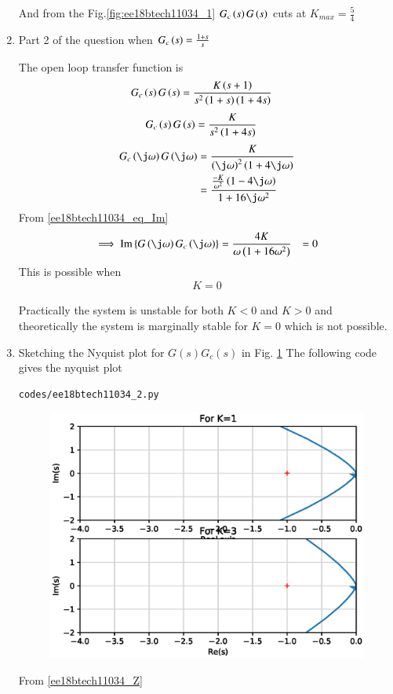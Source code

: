 \begin{enumerate}[label=\thesubsection.\arabic*.,ref=\thesubsection.\theenumi]
And from the Fig.\ref{fig:ee18btech11034_1} $G_{c}\left(s\right)G\left(s\right)$ cuts  at $K_{max} = \frac{5}{4}$

\solution
\item Part 2 of the question when $G_{c}\left(s\right) = \frac{1+s}{s}$

The open loop transfer function is 
\begin{align}
    G_{c}\left(s\right)G\left(s\right) &= \frac{K\left(s+1\right)}{s^2\left(1+s\right)\left(1+4s\right)}
\end{align}
\begin{align}
    G_{c}\left(s\right)G\left(s\right) &= \frac{K}{s^2\left(1+4s\right)}
\end{align}
\begin{align}
    G_{c}\brak{\j\omega}G\brak{\j\omega} &= \frac{K}{\brak{\j\omega}^2\brak{1+4\j\omega}}
    \\
    &= \frac{\frac{-K}{\omega^2}\brak{1-4\j\omega}}{1+16\j\omega^2}
\end{align}
From \eqref{ee18btech11034_eq_Im}
\begin{align}
    \implies \text{Im} \cbrak{G\brak{\j \omega}G_{c}\brak{\j\omega}} &= \frac{4K}{{\omega}\brak{1+16\omega^2}} &= 0
\end{align}
This is possible when 
\begin{align}
    K = 0
    \label{ee18btech11034_3}
\end{align}

Practically the system is unstable for both $K < 0$ and $K > 0$ and theoretically the system is marginally stable for $K = 0$ which is not possible.

\item Sketching the Nyquist plot for $G(s)G_c(s)$ in Fig. \ref{fig:ee18btech11034_2}
The following code gives the nyquist plot
\begin{lstlisting}
codes/ee18btech11034_2.py
\end{lstlisting}
\begin{figure}[!h]
\centering
\includegraphics[width=\columnwidth]{./figs/ee18btech11034_2.eps}
\caption{}
\label{fig:ee18btech11034_2}
\end{figure}
From \eqref{ee18btech11034_Z}


\end{enumerate}

